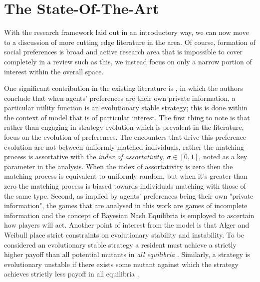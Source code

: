 \documentclass[11pt]{article}
\newcommand*{\np}{\par\noindent\newline}
\begin{document}
\section{The State-Of-The-Art}
With the research framework laid out in an introductory way, we can now move to a discussion of more cutting edge
literature in the area. Of course, formation of social preferences is broad and active research area that is impossible
to cover completely in a review such as this, we instead focus on only a narrow portion of interest within the overall space.

\np One significant contribution in the existing literature is \citep{alger_homo_2013}, in which the authors conclude
that when agents' preferences are their own private information, a particular utility function is an evolutionary stable
strategy; this is done within the context of model that is of particular interest. The first thing to note is that
rather than engaging in strategy evolution which is prevalent in the literature, \citep{alger_homo_2013} focus on the
evolution of preferences. The encounters that drive this preference evolution are not between uniformly matched
individuals, rather the matching process is assortative with the \textit{index of assortativity,} $\sigma \in [0, 1]$,
noted as a key parameter in the analysis. When the index of assortativity is zero then the matching process is
equivalent to uniformly random, but when it's greater than zero the matching process is biased towards individuals
matching with those of the same type. Second, as implied by agents' preferences being their own "private information",
the games that are analysed in this work are games of incomplete information and the concept of Bayesian Nash Equilibria
is employed to ascertain how players will act. Another point of interest from the model is that Alger and Weibull place
strict constraints on evolutionary stability and instability. To be considered an evolutionary stable strategy a
resident must achieve a strictly higher payoff than all potential mutants in \textit{all equilibria} \citep[~p.
2274]{alger_homo_2013}. Similarly, a strategy is evolutionary unstable if there exists some mutant against which the
strategy achieves strictly less payoff in all equilibria \citep[~p. 2275]{alger_homo_2013}.
\end{document}
